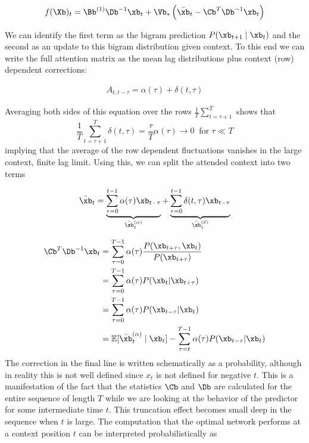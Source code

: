 \documentclass{article}
\begin{document}
\begin{align}
    f(\Xb)_t = \Bb^{(1)}\Db^{-1}\xb_t + \Vb_* \left ( \bar{\xb}_t - \Cb^T\Db^{-1} \xb_t \right ) 
\end{align} 

We can identify the first term as the bigram prediction $P(\xb_{t+1} \mid \xb_t)$ and the second as an update to this bigram distribution given context. To this end we can write the full attention matrix as the mean lag distributions plus context (row) dependent corrections:

\begin{align}
    A_{t,t-\tau} = \alpha(\tau) + \delta(t, \tau)
\end{align}

Averaging both sides of this equation over the rows $\frac{1}{T}\sum_{t=\tau+1}^T$ shows that 
\begin{equation}
    \frac{1}{T}\sum_{t=\tau+1}^T  \delta(t, \tau) = \frac{\tau}{T} \alpha(\tau) \to 0 \;\; \text{for $\tau \ll T$}
\end{equation}
implying that the average of the row dependent fluctuations vanishes in the large context, finite lag limit. Using this, we can split the attended context into two terms

\begin{align}
    \bar{\xb}_t = \underbrace{\sum_{\tau=0}^{t-1}\alpha(\tau)\xb_{t-\tau}}_{\bar{\xb}_t^{(\alpha)}} +  \underbrace{\sum_{\tau=0}^{t-1}\delta(t,\tau)\xb_{t-\tau}}_{\bar{\xb}_t^{(\delta)}}
\end{align}


\begin{align}
 \Cb^T\Db^{-1} \xb_t &= \sum_{\tau = 0}^{T-1} \alpha(\tau) \frac{P(\xb_{t+\tau}, \xb_t)}{P({\xb_{t+\tau}})} \\
 &= \sum_{\tau = 0}^{T-1} \alpha(\tau) P(\xb_t | \xb_{t+\tau}) \\
 &= \sum_{\tau = 0}^{T-1} \alpha(\tau) P(\xb_{t-\tau} | \xb_{t}) \\
 &= \mathbb{E}[\bar{\xb}_t^{(\alpha)} \mid \xb_t] -  \sum_{\tau = t}^{T-1} \alpha(\tau) P(\xb_{t-\tau} | \xb_{t})
\end{align}
The correction in the final line is written schematically as a probability, although in reality this is not well defined since $x_t$ is not defined for negative $t$. This is a manifestation of the fact that the statistics $\Cb$ and $\Db$ are calculated for the entire sequence of length $T$ while we are looking at the behavior of the predictor for some intermediate time $t$. This truncation effect becomes small deep in the sequence when $t$ is large. The computation that the optimal network performs at a context position $t$ can be interpreted probabilistically as
\end{document}

